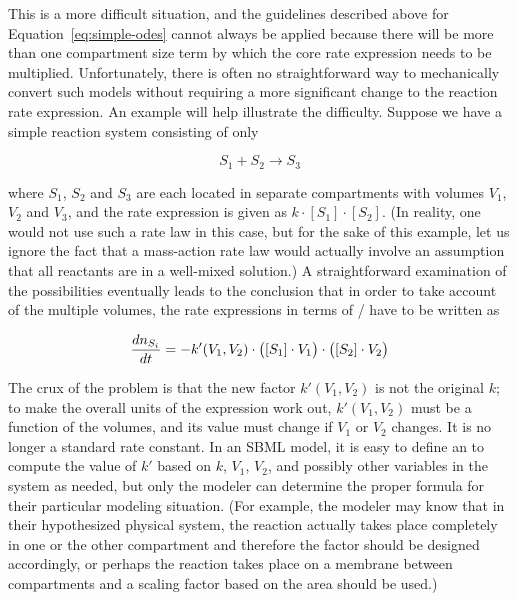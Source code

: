This is a more difficult situation, and the guidelines described
above for Equation~\eqref{eq:simple-odes} cannot always be applied
because there will be more than one compartment size term by which
the core rate expression needs to be multiplied.  Unfortunately,
there is often no straightforward way to mechanically convert such
models without requiring a more significant change to the reaction
rate expression.  An example will help illustrate the difficulty.
Suppose we have a simple reaction system consisting of only
\begin{linenomath}
\begin{equation*}
  S_1 + S_2 \rightarrow S_3
\end{equation*}
\end{linenomath}
where $S_1$, $S_2$ and $S_3$ are each located in separate
compartments with volumes $V_1$, $V_2$ and $V_3$, and the rate
expression is given as $k \cdot [S_1] \cdot [S_2]$.  (In reality,
one would not use such a rate law in this case, but for the sake
of this example, let us ignore the fact that a mass-action rate
law would actually involve an assumption that all reactants are in
a well-mixed solution.)  A straightforward examination of the
possibilities eventually leads to the conclusion that in order to
take account of the multiple volumes, the rate expressions in
terms of / have to be written
as
\begin{linenomath}
\begin{equation*}
  \frac{dn_{S_i}}{dt} = -k'(V_1,V_2) \cdot 
    \bigl([S_1] \cdot V_1\bigr) \cdot \bigl([S_2] \cdot V_2\bigr)\\
\end{equation*}
\end{linenomath}
The crux of the problem is that the new factor $k'(V_1,V_2)$ is
not the original $k$; to make the overall units of the expression
work out, $k'(V_1,V_2)$ must be a function of the volumes, and its
value must change if $V_1$ or $V_2$ changes.  It is no longer a
standard rate constant.  In an SBML model, it is easy to define an
\AssignmentRule to compute the value of $k'$ based on $k$, $V_1$,
$V_2$, and possibly other variables in the system as needed, but
only the modeler can determine the proper formula for their
particular modeling situation.  (For example, the modeler may know
that in their hypothesized physical system, the reaction actually
takes place completely in one or the other compartment and
therefore the factor should be designed accordingly, or perhaps
the reaction takes place on a membrane between compartments and a
scaling factor based on the area should be used.)

